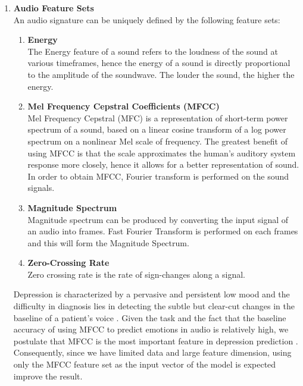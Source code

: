 \documentclass{article}
\begin{document}
	\begin{enumerate}
		\item \textbf{Audio Feature Sets}	\\
		An audio signature can be uniquely defined by the following feature sets:
		\begin{enumerate}
			\item \textbf{Energy}	\\
			The Energy feature of a sound refers to the loudness of the sound at various timeframes, 
			hence the energy of a sound is directly proportional to the amplitude of the soundwave. 
			The louder the sound, the higher the energy.
		
			\item \textbf{Mel Frequency Cepstral Coefficients (MFCC)} \\
			Mel Frequency Cepstral (MFC) is a representation of short-term power spectrum of a sound, 
			based on a linear cosine transform of a log power spectrum on a nonlinear Mel scale of frequency. 
			The greatest benefit of using MFCC is that the scale approximates the 
			human's auditory system response more closely, hence it allows for a better representation of sound. 
			In order to obtain MFCC, Fourier transform is performed on the sound signals.	
		
			\item \textbf{Magnitude Spectrum} \\
			Magnitude spectrum can be produced by converting the input signal of an audio into frames. 
			Fast Fourier Transform is performed on each frames and this will form the Magnitude Spectrum.
			
			\item \textbf{Zero-Crossing Rate} \\
			Zero crossing rate is the rate of sign-changes along a signal.
		\end{enumerate}
	
	Depression is characterized by a pervasive and persistent low mood and the difficulty in diagnosis lies in detecting the subtle but clear-cut changes in the baseline of a patient's voice \cite{Stratou2015}.
	Given the task and the fact that the baseline accuracy of using MFCC to predict emotions in audio is relatively high, 
	we postulate that MFCC is the most important feature in depression prediction \cite{ElAyadi2011}. 
	Consequently, since we have limited data and large feature dimension, 
	using only the MFCC feature set as the input vector of the model is expected improve the result.
		

\end{enumerate}
\end{document}
